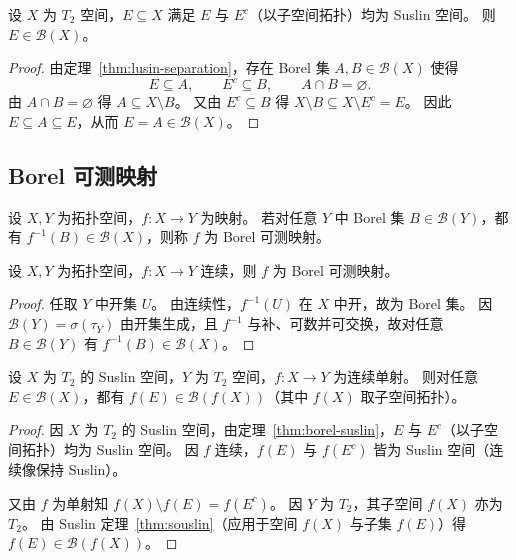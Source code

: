 \documentclass[lang=cn,a4paper,newtx,figureplace=section,tableplace=section]{elegantbook}
\begin{document}
\begin{theorem}[Suslin 定理]\label{thm:souslin}
  设 $X$ 为 $T_2$ 空间，$E\subseteq X$ 满足 $E$ 与 $E^c$（以子空间拓扑）均为 Suslin 空间。
  则 $E\in\mathcal{B}(X)$。
\end{theorem}

\begin{proof}
  由定理~\ref{thm:lusin-separation}，存在 Borel 集 $A,B\in\mathcal{B}(X)$ 使得
  \[
    E\subseteq A,\qquad E^c\subseteq B,\qquad A\cap B=\varnothing.
  \]
  由 $A\cap B=\varnothing$ 得 $A\subseteq X\setminus B$。
  又由 $E^c\subseteq B$ 得 $X\setminus B\subseteq X\setminus E^c=E$。
  因此 $E\subseteq A\subseteq E$，从而 $E=A\in\mathcal{B}(X)$。
\end{proof}

\subsection{Borel 可测映射}

\begin{definition}\label{def:borel-measurable}
  设 $X,Y$ 为拓扑空间，$f:X\to Y$ 为映射。
  若对任意 $Y$ 中 Borel 集 $B\in\mathcal{B}(Y)$，都有 $f^{-1}(B)\in\mathcal{B}(X)$，则称 $f$ 为 Borel 可测映射。
\end{definition}

\begin{proposition}\label{prop:continuous-borel-measurable}
  设 $X,Y$ 为拓扑空间，$f:X\to Y$ 连续，则 $f$ 为 Borel 可测映射。
\end{proposition}

\begin{proof}
  任取 $Y$ 中开集 $U$。
  由连续性，$f^{-1}(U)$ 在 $X$ 中开，故为 Borel 集。
  因 $\mathcal{B}(Y)=\sigma(\tau_Y)$ 由开集生成，且 $f^{-1}$ 与补、可数并可交换，故对任意 $B\in\mathcal{B}(Y)$ 有 $f^{-1}(B)\in\mathcal{B}(X)$。
\end{proof}

\begin{corollary}\label{cor:continuous-injective-borel-image}
  设 $X$ 为 $T_2$ 的 Suslin 空间，$Y$ 为 $T_2$ 空间，$f:X\to Y$ 为连续单射。
  则对任意 $E\in\mathcal{B}(X)$，都有 $f(E)\in\mathcal{B}(f(X))$（其中 $f(X)$ 取子空间拓扑）。
\end{corollary}

\begin{proof}
  因 $X$ 为 $T_2$ 的 Suslin 空间，由定理~\ref{thm:borel-suslin}，$E$ 与 $E^c$（以子空间拓扑）均为 Suslin 空间。
  因 $f$ 连续，$f(E)$ 与 $f(E^c)$ 皆为 Suslin 空间（连续像保持 Suslin）。

  又由 $f$ 为单射知 $f(X)\setminus f(E)=f(E^c)$。
  因 $Y$ 为 $T_2$，其子空间 $f(X)$ 亦为 $T_2$。
  由 Suslin 定理~\ref{thm:souslin}（应用于空间 $f(X)$ 与子集 $f(E)$）得 $f(E)\in\mathcal{B}(f(X))$。
\end{proof}
\end{document}
